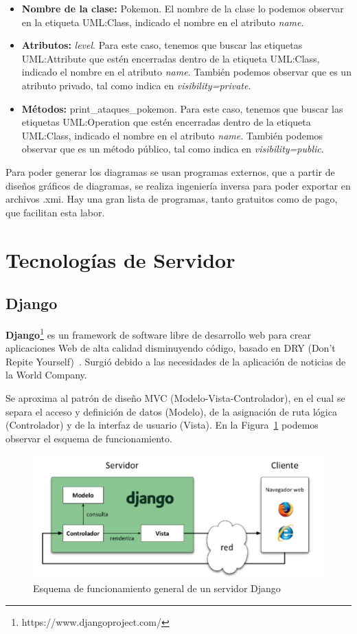 \documentclass[a4paper, 12pt]{book}
\begin{document}
\begin{itemize}
   \item \textbf{Nombre de la clase:} Pokemon. El nombre de la clase lo podemos observar en la etiqueta UML:Class, indicado el nombre en el atributo \emph{name}.
   \item \textbf{Atributos:} \emph{level}. Para este caso, tenemos que buscar las etiquetas UML:Attribute que estén encerradas dentro de la etiqueta UML:Class, indicado el nombre en el atributo \emph{name}. También podemos observar que es un atributo privado, tal como indica en \textit{visibility=private}.
   \item \textbf{Métodos:} print\_ataques\_pokemon. Para este caso, tenemos que buscar las etiquetas UML:Operation que estén encerradas dentro de la etiqueta UML:Class, indicado el nombre en el atributo \emph{name}. También podemos observar que es un método público, tal como indica en \textit{visibility=public}.
\end{itemize}

Para poder generar los diagramas se usan programas externos, que a partir de diseños gráficos de diagramas, se realiza ingeniería inversa para poder exportar en archivos .xmi. Hay una gran lista de programas, tanto gratuitos como de pago, que facilitan esta labor.

\section{Tecnologías de Servidor}
\label{sec:seccion2}

\subsection{Django}
\label{subsec:django}
\textbf{Django}\footnote{https://www.djangoproject.com/} es un framework de software libre de desarrollo web para crear aplicaciones Web de alta calidad
disminuyendo código, basado en DRY (Don't Repite Yourself)~\cite{forcier2008python}. Surgió debido a las necesidades de la aplicación
de noticias de la World Company.

Se aproxima al patrón de diseño MVC (Modelo-Vista-Controlador), en el cual se separa
el acceso y definición de datos (Modelo), de la asignación de ruta lógica (Controlador) y
de la interfaz de usuario (Vista). En la Figura~\ref{fig:esquemadjango} podemos observar el esquema de funcionamiento.

\begin{figure}[htb]
  \centering
  \includegraphics[width=12cm, keepaspectratio]{img/esquemadjango}
  \caption{Esquema de funcionamiento general de un servidor Django}
  \label{fig:esquemadjango}
\end{figure}
\end{document}
